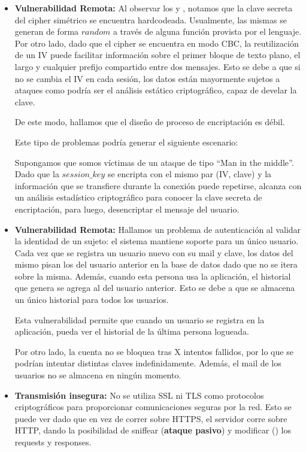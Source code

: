 \documentclass[10pt, a4paper]{article}
\begin{document}
\begin{itemize}

\item \textbf{Vulnerabilidad Remota:} Al observar los  y , notamos que la clave secreta del cipher simétrico se encuentra hardcodeada. Usualmente, las mismas se generan de forma $random$ a través de alguna función provista por el lenguaje. 
Por otro lado, dado que el cipher se encuentra en modo CBC, la reutilización de un IV puede facilitar información sobre el primer bloque de texto plano, el largo y cualquier prefijo compartido entre dos mensajes.
Esto se debe a que si no se cambia el IV en cada sesión, los datos están mayormente sujetos a ataques como podría ser el análisis estático criptográfico, capaz de develar la clave. 

De este modo, hallamos que el diseño de proceso de encriptación es débil.

Este tipo de problemas podría generar el siguiente escenario:

Supongamos que somos víctimas de un ataque de tipo ``Man in the middle''. Dado que la $session\_key$ se encripta con el mismo par (IV, clave) y la información que se transfiere durante la conexión puede repetirse, alcanza con un análisis estadístico criptográfico para conocer la clave secreta de encriptación, para luego, desencriptar el mensaje del usuario.

\item \textbf{Vulnerabilidad Remota:} Hallamos un problema de autenticación al validar la identidad de un sujeto: el sistema mantiene soporte para un único usuario. Cada vez que se registra un usuario nuevo con su mail y clave, los datos del mismo pisan los del usuario anterior en la base de datos dado que no se itera sobre la misma. Además, cuando esta persona usa la aplicación, el historial que genera se agrega al del usuario anterior. Esto se debe a que se almacena un único historial para todos los usuarios.

Esta vulnerabilidad permite que cuando un usuario se registra en la aplicación, pueda ver el historial de la última persona logueada.

Por otro lado, la cuenta no se bloquea tras X intentos fallidos, por lo que se podrían intentar distintas claves indefinidamente. Además, el mail de los usuarios no se almacena en ningún momento. 

\item \textbf{Transmisión insegura:} No se utiliza SSL ni TLS como protocolos criptográficos para proporcionar comunicaciones seguras por la red. Esto se puede ver dado que en vez de correr sobre HTTPS, el servidor corre sobre HTTP, dando la posibilidad de sniffear (\textbf{ataque pasivo}) y modificar () los requests y responses.


\end{itemize}
\end{document}
